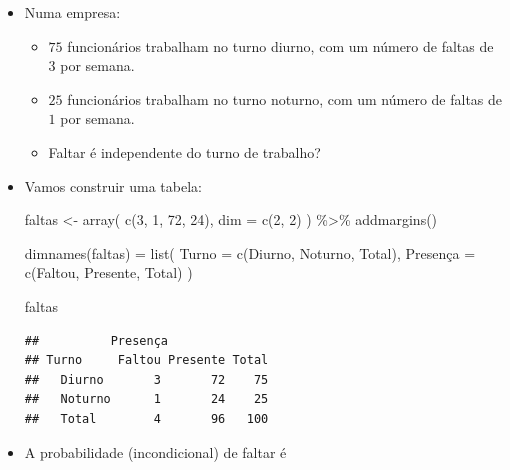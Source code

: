 \documentclass[
  11pt]{report}
\newenvironment{Shaded}{\begin{snugshade}}{\end{snugshade}}
\newcommand{\AttributeTok}[1]{\textcolor[rgb]{0.77,0.63,0.00}{#1}}
\newcommand{\DecValTok}[1]{\textcolor[rgb]{0.00,0.00,0.81}{#1}}
\newcommand{\FunctionTok}[1]{\textcolor[rgb]{0.00,0.00,0.00}{#1}}
\newcommand{\NormalTok}[1]{#1}
\newcommand{\OtherTok}[1]{\textcolor[rgb]{0.56,0.35,0.01}{#1}}
\newcommand{\SpecialCharTok}[1]{\textcolor[rgb]{0.00,0.00,0.00}{#1}}
\newcommand{\StringTok}[1]{\textcolor[rgb]{0.31,0.60,0.02}{#1}}
\renewenvironment{Shaded}{
    \begin{mdframed}[%
      roundcorner=2pt,%
      innerleftmargin=5pt,%
      innerrightmargin=5pt,%
      topline=true,%
      leftline=true,%
      rightline=true,%
      bottomline=true,%
      linewidth=0.5pt,%
      linecolor=black!20,%
      backgroundcolor=black!2,%
      skipabove=2ex,%
      skipbelow=2.5ex%
    ]%
  }
  {
    \end{mdframed}
  }
\begin{document}
\begin{itemize}
\item
  Numa empresa:

  \begin{itemize}
  \item
    $75$ funcionários trabalham no turno diurno, com um número de faltas de $3$ por semana.
  \item
    $25$ funcionários trabalham no turno noturno, com um número de faltas de $1$ por semana.
  \item
    Faltar é independente do turno de trabalho?
  \end{itemize}
\item
  Vamos construir uma tabela:

\begin{Shaded}
\begin{Highlighting}[]
\NormalTok{faltas }\OtherTok{\textless{}{-}} \FunctionTok{array}\NormalTok{(}
  \FunctionTok{c}\NormalTok{(}\DecValTok{3}\NormalTok{, }\DecValTok{1}\NormalTok{, }\DecValTok{72}\NormalTok{, }\DecValTok{24}\NormalTok{),}
  \AttributeTok{dim =} \FunctionTok{c}\NormalTok{(}\DecValTok{2}\NormalTok{, }\DecValTok{2}\NormalTok{)}
\NormalTok{) }\SpecialCharTok{\%\textgreater{}\%} 
  \FunctionTok{addmargins}\NormalTok{()}

\FunctionTok{dimnames}\NormalTok{(faltas) }\OtherTok{=} \FunctionTok{list}\NormalTok{(}
    \StringTok{\textquotesingle{}Turno\textquotesingle{}} \OtherTok{=} \FunctionTok{c}\NormalTok{(}\StringTok{\textquotesingle{}Diurno\textquotesingle{}}\NormalTok{, }\StringTok{\textquotesingle{}Noturno\textquotesingle{}}\NormalTok{, }\StringTok{\textquotesingle{}Total\textquotesingle{}}\NormalTok{),}
    \StringTok{\textquotesingle{}Presença\textquotesingle{}} \OtherTok{=} \FunctionTok{c}\NormalTok{(}\StringTok{\textquotesingle{}Faltou\textquotesingle{}}\NormalTok{, }\StringTok{\textquotesingle{}Presente\textquotesingle{}}\NormalTok{, }\StringTok{\textquotesingle{}Total\textquotesingle{}}\NormalTok{)}
\NormalTok{  )}

\NormalTok{faltas}
\end{Highlighting}
\end{Shaded}

\begin{verbatim}
##          Presença
## Turno     Faltou Presente Total
##   Diurno       3       72    75
##   Noturno      1       24    25
##   Total        4       96   100
\end{verbatim}
\item
  A probabilidade (incondicional) de faltar é


\end{itemize}
\end{document}
